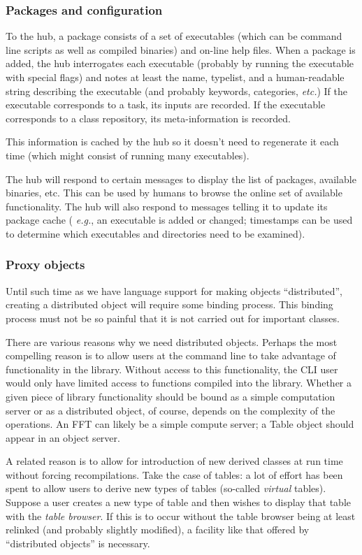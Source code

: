 \subsubsection{Packages and configuration}
To the hub, a package consists of a set of executables (which can be
command line scripts as well as compiled binaries) and on-line help
files. When a package is added, the hub interrogates each executable
(probably by running the executable with special flags) and notes at
least the name, typelist, and a human-readable string describing the
executable (and probably keywords, categories, {\em etc.})  If the
executable corresponds to a task, its inputs are recorded. If the
executable corresponds to a class repository, its meta-information is
recorded.

This information is cached by the hub so it doesn't need to regenerate
it each time (which might consist of running many executables).

The hub will respond to certain messages to display the list of
packages, available binaries, etc. This can be used by humans to
browse the online set of available functionality. The hub will also
respond to messages telling it to update its package cache ({\it
e.g.}, an executable is added or changed; timestamps can be used to
determine which executables and directories need to be examined).
\subsubsection{Proxy objects}

Until such time as we have language support for making objects
``distributed'', creating a distributed object will require some
binding process. This binding process must not be so painful that it
is not carried out for important classes.

There are various reasons why we need distributed objects. Perhaps the
most compelling reason is to allow users at the command line to take
advantage of functionality in the library. Without access to this
functionality, the CLI user would only have limited access to
functions compiled into the library. Whether a given piece of library
functionality should be bound as a simple computation server or as a
distributed object, of course, depends on the complexity of the
operations. An FFT can likely be a simple compute server; a Table
object should appear in an object server.

A related reason is to allow for introduction of new derived classes
at run time without forcing recompilations.  Take the case of tables:
a lot of effort has been spent to allow users to derive new types of
tables (so-called {\em virtual} tables).  Suppose a user creates a new
type of table and then wishes to display that table with the {\em
table browser}. If this is to occur without the table browser being at
least relinked (and probably slightly modified), a facility like that
offered by ``distributed objects'' is necessary.

